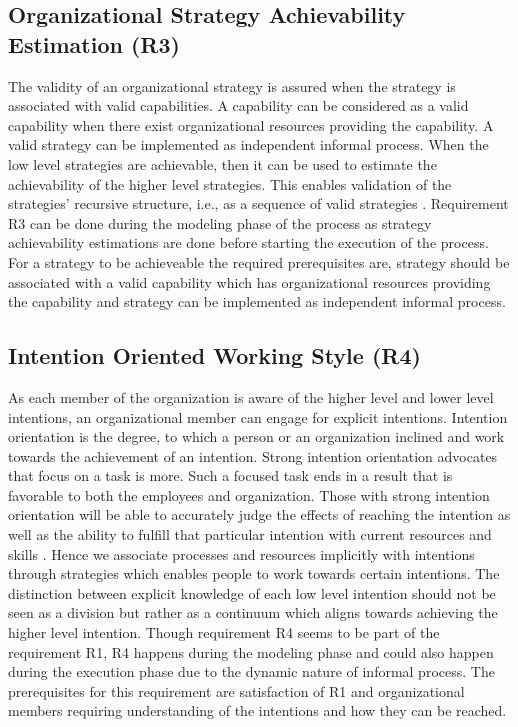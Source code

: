 \subsection{Organizational Strategy Achievability Estimation (R3)}
The validity of an organizational strategy is assured when the strategy is associated with valid capabilities. A capability can be considered as a valid capability when there exist organizational resources providing the capability. A valid strategy can be implemented as independent informal process. When the low level strategies are achievable, then it can be used to estimate the achievability of the higher level strategies. This enables validation of the strategies' recursive structure, i.e., as a sequence of valid strategies \cite{Bleistein2006}. Requirement R3  can be done during the modeling phase of the process as strategy achievability estimations are done before starting the execution of the process. For a strategy to be achieveable the required prerequisites are, strategy should be associated with a valid capability which has organizational resources providing the capability and strategy can be implemented as independent informal process.
 
\subsection{Intention Oriented Working Style (R4)}
As each member of the organization is aware of the higher level and lower level intentions, an organizational member can engage for explicit intentions. Intention orientation is the degree, to which a person or an organization inclined and work towards the achievement of an intention. Strong intention orientation advocates that focus on a task is more. Such a focused task ends in a result that is favorable to both the employees and organization. Those with strong intention orientation will be able to accurately judge the effects of reaching the intention as well as the ability to fulfill that particular intention with current resources and skills \cite{Lacom}. Hence we associate processes and resources implicitly with intentions through strategies which enables people to work towards certain intentions. The distinction between explicit knowledge of each low level intention should not be seen as a division but rather as a continuum which aligns towards achieving the higher level intention. Though requirement R4 seems to be part of the requirement R1, R4 happens during the modeling phase and could also happen during the execution phase due to the dynamic nature of informal process. The prerequisites for this requirement are satisfaction of R1 and organizational members requiring understanding of the intentions and how they can be reached.  

